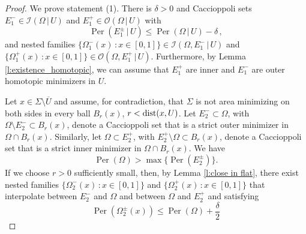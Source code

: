 \documentclass[12pt,twoside]{amsart}
\numberwithin{equation}{section}
\renewcommand{\leq}{\leqslant}
\newcommand{\cI}{\mathcal I}
\newcommand{\cO}{\mathcal O}
\DeclareMathOperator{\Per}{Per}
\begin{document}
	\begin{proof} 
We prove statement (1).
There is $\delta>0$ and Caccioppoli sets $E^-_1 \in \cI(\Omega\,|\,U)$ and $ E^+_1\in \cO(\Omega\,|\,U)$ with 
	\begin{equation}\label{e:vol_dec}
	\Per(E^\pm_1\,|\, U)\leq \Per(\Omega\,|\, U)-\delta\,,
	\end{equation}
	and nested families $\{\Omega^-_1(x)\,:x\in [0,1]\} \in \cI(\Omega, E_1^-\,|\,U)$ and $\{\Omega^+_1(x)\,:x\in [0,1]\} \in \cO(\Omega, E_1^+\,|\,U)$. Furthermore, by Lemma \ref{l:existence_homotopic}, we can assume that $E_1^+$ are inner and $E_1^-$ are outer homotopic minimizers in $U$.
	
    Let $x \in \Sigma \setminus \overline{U}$ and assume, for contradiction,
	that $\Sigma$ is not area minimizing on both sides 
	in every ball $B_r(x)$, $r< {\rm dist}(x, U)$. Let $E^-_2 \subset \Omega$, 
	with $\Omega \setminus  E^-_2 \subset B_r(x)$, denote a Caccioppoli set
	that is a strict outer minimizer in $\Omega \cap B_r(x)$.
	Similarly, let $ \Omega \subset E^+_2$, with
	$ E^+_2 \setminus \Omega \subset B_r(x)$, denote a Caccioppoli set
	that is a strict inner minimizer in $\Omega \cap B_r(x)$.
    We have $$\Per(\Omega)> \max\{\Per(E^\pm_2) \}.$$
	If we choose $r>0$ sufficiently small,
	then, by Lemma \ref{l:close in flat}, there exist nested families $\{\Omega^-_2(x)\,:x\in [0,1]\}$ and $\{\Omega^+_2(x)\,:x\in [0,1]\} $ that interpolate between $E^-_2$ and 
	$\Omega$ and between $\Omega$ and $E^+_2$ and satisfying
\begin{equation}\label{e:vol_dec2}
\Per(\Omega^\pm_2(x))\leq \Per(\Omega) + \frac{\delta}{2}
\end{equation}


\end{proof}
\end{document}
